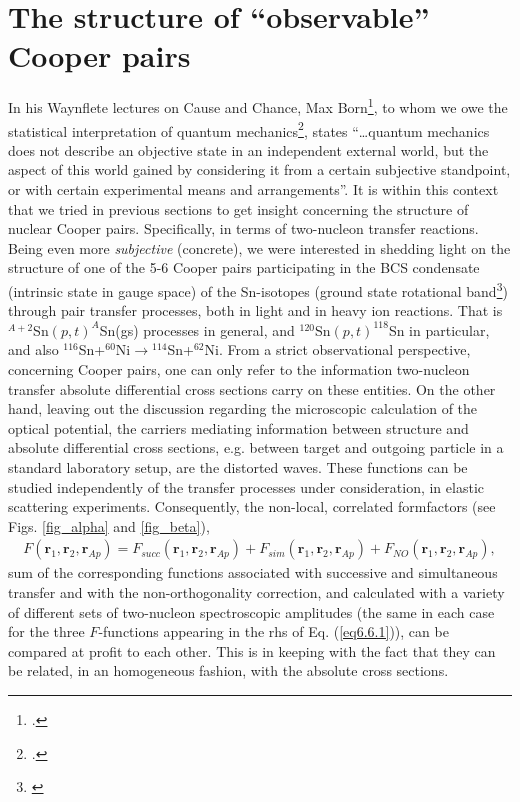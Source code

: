 \section{The structure of ``observable'' Cooper pairs}\label{S6.5.4}
In his Waynflete lectures on Cause and Chance, Max Born\footnote{\cite{Born:48}.}, to whom we owe the statistical interpretation of quantum mechanics\footnote{\cite{Born:64,Pais:86}.}, states ``\dots quantum mechanics does not describe an objective state in an independent external world, but the aspect of this world gained by considering it from a certain subjective standpoint, or with certain experimental means and arrangements''. It is within this context that we tried in previous sections to get insight concerning the structure of nuclear Cooper pairs. Specifically, in terms of two-nucleon transfer reactions. Being even more \textit{subjective} (concrete), we were interested in shedding light on the structure of one of the 5-6 Cooper pairs participating in the BCS condensate (intrinsic state in gauge space) of the Sn-isotopes (ground state rotational band\footnote{\cite{Potel:13b,Potel:17}}) through pair transfer processes, both in light and in heavy ion reactions. That is $^{A+2}$Sn$(p,t)^{A}$Sn(gs) processes in general, and $^{120}$Sn$(p,t)^{118}$Sn in particular, and also $^{116}$Sn+$^{60}$Ni$\to$$^{114}$Sn+$^{62}$Ni. From a strict observational perspective, concerning Cooper pairs, one can only refer to the information two-nucleon transfer absolute differential cross sections carry on these entities. On the other hand, leaving out the discussion regarding the microscopic calculation of the optical potential, the carriers mediating information between structure and absolute differential cross sections, e.g. between target and outgoing particle in a standard laboratory setup, are the distorted waves. These functions can be studied independently of the transfer processes under consideration, in elastic scattering experiments. Consequently, the non-local, correlated formfactors (see Figs. \ref{fig_alpha} and \ref{fig_beta}),
\begin{align}\label{eq6.6.1}
F(\mathbf r_1,\mathbf r_2,\mathbf r_{Ap})=F_{succ}(\mathbf r_1,\mathbf r_2,\mathbf r_{Ap})+F_{sim}(\mathbf r_1,\mathbf r_2,\mathbf r_{Ap})+F_{NO}(\mathbf r_1,\mathbf r_2,\mathbf r_{Ap}),
\end{align}
sum of the corresponding functions associated with successive and simultaneous transfer  and with the non-orthogonality correction, and calculated with a variety of different sets of two-nucleon spectroscopic amplitudes (the same in each case for the three $F$-functions appearing in the rhs of Eq. (\ref{eq6.6.1})), can be compared at profit to each other. This is in keeping with the fact that they can be related, in an homogeneous fashion, with the absolute cross sections.

